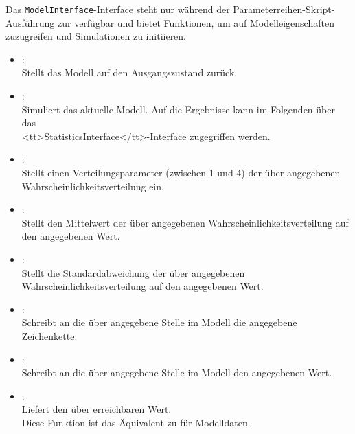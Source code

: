 Das \texttt{ModelInterface}-Interface steht nur während der Parameterreihen-Skript-Ausführung
zur verfügbar und bietet Funktionen, um auf Modelleigenschaften zuzugreifen und
Simulationen zu initiieren.

\begin{itemize}

\item
{}:\\
Stellt das Modell auf den Ausgangszustand zurück.

\item
{}:\\
Simuliert das aktuelle Modell.
Auf die Ergebnisse kann im Folgenden über das\\
<tt>StatisticsInterface</tt>-Interface zugegriffen werden.

\item
{}:\\
Stellt einen Verteilungsparameter  (zwischen 1 und 4) der über 
angegebenen Wahrscheinlichkeitsverteilung ein.

\item
{}:\\
Stellt den Mittelwert der über  angegebenen Wahrscheinlichkeitsverteilung auf den angegebenen Wert.

\item
{}:\\
Stellt die Standardabweichung der über  angegebenen Wahrscheinlichkeitsverteilung auf den angegebenen Wert.

\item
{}:\\
Schreibt an die über  angegebene Stelle im Modell die angegebene Zeichenkette.

\item
{}:\\
Schreibt an die über  angegebene Stelle im Modell den angegebenen Wert.

\item
{}:\\
Liefert den über  erreichbaren Wert.\\
Diese Funktion ist das Äquivalent zu  für Modelldaten.


\end{itemize}
